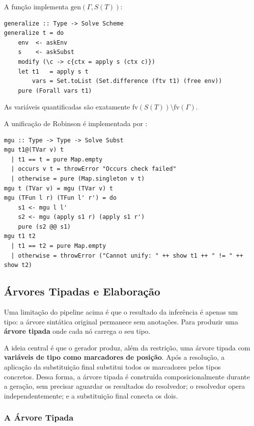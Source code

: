   A função  implementa
  \(\mathrm{gen}(\Gamma, S(T))\):

\begin{verbatim}
generalize :: Type -> Solve Scheme
generalize t = do
    env  <- askEnv
    s    <- askSubst
    modify (\c -> c{ctx = apply s (ctx c)})
    let t1   = apply s t
        vars = Set.toList (Set.difference (ftv t1) (free env))
    pure (Forall vars t1)
\end{verbatim}

  As variáveis quantificadas são exatamente
  \(\mathrm{fv}(S(T)) \setminus \mathrm{fv}(\Gamma)\).

  A unificação de Robinson é implementada por :

\begin{verbatim}
mgu :: Type -> Type -> Solve Subst
mgu t1@(TVar v) t
  | t1 == t = pure Map.empty
  | occurs v t = throwError "Occurs check failed"
  | otherwise = pure (Map.singleton v t)
mgu t (TVar v) = mgu (TVar v) t
mgu (TFun l r) (TFun l' r') = do
    s1 <- mgu l l'
    s2 <- mgu (apply s1 r) (apply s1 r')
    pure (s2 @@ s1)
mgu t1 t2
  | t1 == t2 = pure Map.empty
  | otherwise = throwError ("Cannot unify: " ++ show t1 ++ " != " ++ show t2)
\end{verbatim}

  \subsection{Árvores Tipadas e Elaboração}

  Uma limitação do pipeline acima é que o resultado da inferência é
  apenas um tipo: a árvore sintática original permanece sem anotações.
  Para produzir uma \textbf{árvore tipada} onde cada nó carrega o seu tipo.

  A ideia central é que o gerador produz, além da restrição, uma árvore
  tipada com \textbf{variáveis de tipo como marcadores de posição}.
  Após a resolução, a aplicação da substituição final substitui todos
  os marcadores pelos tipos concretos. Dessa forma,
  a árvore tipada é construída composicionalmente durante a geração,
  sem precisar aguardar os resultados do resolvedor; o resolvedor opera
  independentemente; e a substituição final conecta os dois.

  \subsubsection{A Árvore Tipada}

